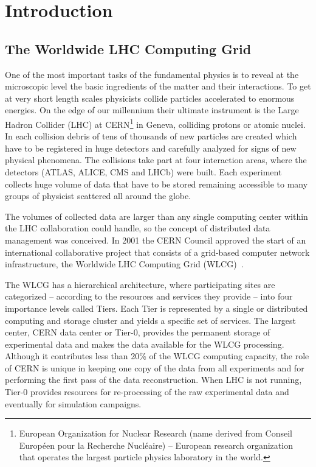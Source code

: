 \chapter*{Introduction}

\section*{The Worldwide LHC Computing Grid}

One of the most important tasks of the fundamental physics is to reveal at the microscopic level the basic 
ingredients of the matter and their interactions. To get at very short length scales physicists collide particles
accelerated to enormous energies. On the edge of our millennium their ultimate instrument is the Large Hadron 
Collider (LHC) at CERN\footnote{European Organization for Nuclear Research 
(name derived from Conseil Européen pour la Recherche Nucléaire) -- European research organization that operates 
the largest particle physics laboratory in the world.} in Geneva, colliding protons or atomic nuclei. In each 
collision debris of tens of thousands of new particles are created which have to be registered in huge detectors 
and carefully analyzed for signs of new physical phenomena. The collisions take part at four interaction areas, 
where the detectors (ATLAS, ALICE, CMS and LHCb) were built. Each experiment collects huge volume of data that have
to be stored remaining accessible to many groups of physicist scattered all around the globe.

The volumes of collected data are larger than
any single computing center within the LHC collaboration could handle, so the concept of 
distributed data management was conceived. In 2001 the CERN Council approved the start of an international 
collaborative project that consists of a grid-based computer network infrastructure, the Worldwide LHC Computing 
Grid (WLCG)~\cite{happyBday}. 

The WLCG has a hierarchical architecture, where participating sites are categorized -- according to the resources 
and services they provide -- into four importance levels called Tiers. Each Tier is represented by a single or 
distributed computing and storage cluster and yields a specific set of services. The largest center, CERN data 
center or Tier-0, provides the  permanent storage of experimental data and makes the data available for the WLCG 
processing. Although it contributes less than 20\% of the WLCG computing capacity, the role of CERN is unique in 
keeping one copy of the data from all experiments and for performing the first pass of the data reconstruction. 
When LHC is not running, Tier-0 provides resources for re-processing of the raw experimental data and eventually 
for simulation campaigns. 


